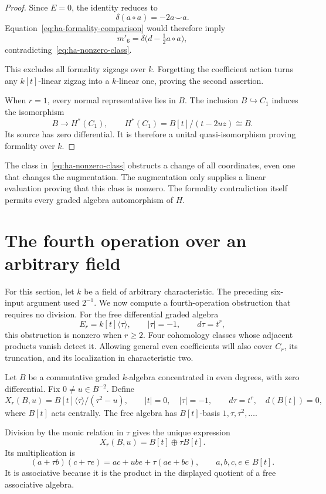\begin{proof}
Since $E=0$, the identity reduces to
\[
 \delta(a\circ a)=-2a\smile a.
\]
Equation~\eqref{eq:ha-formality-comparison} would therefore imply
\[
 m'_6=\delta\bigl(d-\tfrac12a\circ a\bigr),
\]
contradicting~\eqref{eq:ha-nonzero-class}.

This excludes all formality zigzags over $k$.
Forgetting the coefficient action turns any $k[t]$-linear zigzag
into a $k$-linear one, proving the second assertion.

When $r=1$, every normal representative lies in $B$.
The inclusion $B\hookrightarrow C_1$ induces the isomorphism
\[
 B\longrightarrow H^*(C_1),\qquad
 H^*(C_1)=B[t]/(t-2uz)\cong B.
\]
Its source has zero differential. It is therefore a unital
quasi-isomorphism proving formality over $k$.
\end{proof}

The class in~\eqref{eq:ha-nonzero-class} obstructs a change of all
coordinates, even one that changes the augmentation.
The augmentation only supplies a linear evaluation proving that this
class is nonzero. The formality contradiction itself permits every
graded algebra automorphism of $H$.

\section{The fourth operation over an arbitrary field}
\label{sec:ha-arbitrary-field}

For this section, let $k$ be a field of arbitrary characteristic.
The preceding six-input argument used $2^{-1}$.
We now compute a fourth-operation obstruction that requires no division.
For the free differential graded algebra
\[
 E_r=k[t]\langle\tau\rangle,\qquad |\tau|=-1,\qquad d\tau=t^r,
\]
this obstruction is nonzero when $r\geq2$.
Four cohomology classes whose adjacent products vanish detect it.
Allowing general even coefficients will also cover $C_r$, its
truncation, and its localization in characteristic two.

Let $B$ be a commutative graded $k$-algebra concentrated in even
degrees, with zero differential. Fix $0\ne u\in B^{-2}$.
Define
\[
 X_r(B,u)=B[t]\langle\tau\rangle/(\tau^2-u),
 \qquad |t|=0,\quad|\tau|=-1,
 \qquad d\tau=t^r,\quad d(B[t])=0,
\]
where $B[t]$ acts centrally.
The free algebra has $B[t]$-basis $1,\tau,\tau^2,\ldots$.

Division by the monic relation in $\tau$ gives the unique expression
\[
 X_r(B,u)=B[t]\oplus\tau B[t].
\]
Its multiplication is
\[
 (a+\tau b)(c+\tau e)=ac+ube+\tau(ae+bc),
 \qquad a,b,c,e\in B[t].
\]
It is associative because it is the product in the displayed quotient
of a free associative algebra.

